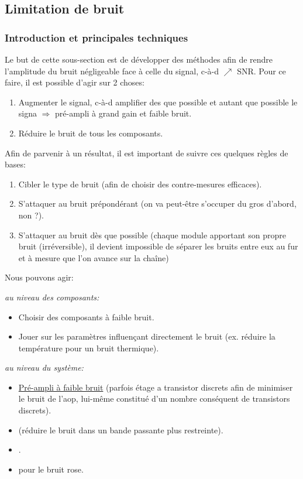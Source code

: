 \subsection{Limitation de bruit}
\subsubsection{Introduction et principales techniques}
Le but de cette sous-section est de développer des méthodes afin de rendre l'amplitude du bruit négligeable face à celle du signal, c-à-d $\nearrow$ SNR. Pour ce faire, il est possible d'agir sur 2 choses:
\begin{enumerate}
	\item Augmenter le signal, c-à-d amplifier des que possible et autant que possible le signa $\Rightarrow$ pré-ampli à grand gain et faible bruit.
	\item Réduire le bruit de tous les composants.
\end{enumerate}
Afin de parvenir à un résultat, il est important de suivre ces quelques règles de bases:
\begin{enumerate}
	\item Cibler le type de bruit (afin de choisir des contre-mesures efficaces).
	\item S'attaquer au bruit prépondérant (on va peut-être s'occuper du gros d'abord, non ?).
	\item S'attaquer au bruit dès que possible (chaque module apportant son propre bruit (irréversible), il devient impossible de séparer les bruits entre eux au fur et à mesure que l'on avance sur la chaîne)
\end{enumerate}
Nous pouvons agir:
\begin{description}
\item \emph{au niveau des composants:}
\begin{itemize}
	\item Choisir des composants à faible bruit.
	\item Jouer sur les paramètres influençant directement le bruit (ex. réduire la température pour un bruit thermique).
\end{itemize}
\item \emph{au niveau du système:}
\begin{itemize}
	\item \hyperref[subsubsec:entreenobruit]{Pré-ampli à faible bruit} (parfois étage a transistor discrets afin de minimiser le bruit de l'aop, lui-même constitué d'un nombre conséquent de transistors discrets).
	\item {} (réduire le bruit dans un bande passante plus restreinte).
	\item {}.
	\item {} pour le bruit rose.
\end{itemize}
\end{description}
